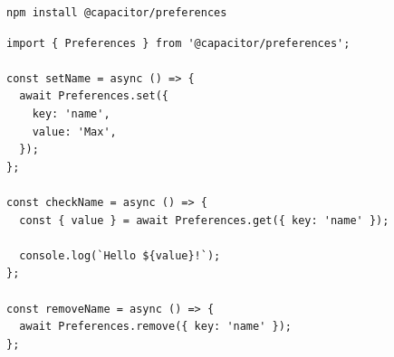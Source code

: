 \begin{lstlisting}[language=HTML, caption=Kode untuk Menginstal Plugin Preference, label=kode:install-preference-capacitor]
npm install @capacitor/preferences
\end{lstlisting}

\begin{lstlisting}[language=HTML, caption=Contoh Kode Plugin Preference, label=kode:preference-capacitor-example]
import { Preferences } from '@capacitor/preferences';

const setName = async () => {
  await Preferences.set({
    key: 'name',
    value: 'Max',
  });
};

const checkName = async () => {
  const { value } = await Preferences.get({ key: 'name' });

  console.log(`Hello ${value}!`);
};

const removeName = async () => {
  await Preferences.remove({ key: 'name' });
};
\end{lstlisting}





		
			
